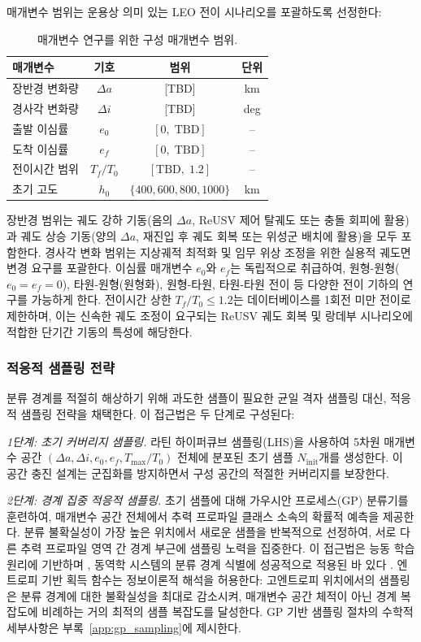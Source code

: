 매개변수 범위는 운용상 의미 있는 LEO 전이 시나리오를 포괄하도록 선정한다:

\begin{table}[ht]
\centering
\caption{매개변수 연구를 위한 구성 매개변수 범위.}
\label{tab:param_ranges}
\begin{tabular}{lccc}
\hline
매개변수 & 기호 & 범위 & 단위 \\
\hline
장반경 변화량 & $\Delta a$ & [TBD] & km \\
경사각 변화량 & $\Delta i$ & [TBD] & deg \\
출발 이심률 & $e_0$ & $[0,\;\text{TBD}]$ & -- \\
도착 이심률 & $e_f$ & $[0,\;\text{TBD}]$ & -- \\
전이시간 범위 & $T_f/T_0$ & $[\text{TBD},\; 1.2]$ & -- \\
초기 고도 & $h_0$ & $\{400, 600, 800, 1000\}$ & km \\
\hline
\end{tabular}
\end{table}

장반경 범위는 궤도 강하 기동(음의 $\Delta a$, ReUSV 제어 탈궤도 또는 충돌 회피에 활용)과 궤도 상승 기동(양의 $\Delta a$, 재진입 후 궤도 회복 또는 위성군 배치에 활용)을 모두 포함한다. 경사각 변화 범위는 지상궤적 최적화 및 임무 위상 조정을 위한 실용적 궤도면 변경 요구를 포괄한다. 이심률 매개변수 $e_0$와 $e_f$는 독립적으로 취급하여, 원형-원형($e_0 = e_f = 0$), 타원-원형(원형화), 원형-타원, 타원-타원 전이 등 다양한 전이 기하의 연구를 가능하게 한다. 전이시간 상한 $T_f/T_0 \leq 1.2$는 데이터베이스를 1회전 미만 전이로 제한하며, 이는 신속한 궤도 조정이 요구되는 ReUSV 궤도 회복 및 랑데부 시나리오에 적합한 단기간 기동의 특성에 해당한다.

\subsubsection{적응적 샘플링 전략}

분류 경계를 적절히 해상하기 위해 과도한 샘플이 필요한 균일 격자 샘플링 대신, 적응적 샘플링 전략을 채택한다. 이 접근법은 두 단계로 구성된다:

\textit{1단계: 초기 커버리지 샘플링.} 라틴 하이퍼큐브 샘플링(LHS)을 사용하여 5차원 매개변수 공간 $(\Delta a, \Delta i, e_0, e_f, T_{\max}/T_0)$ 전체에 분포된 초기 샘플 $N_{\text{init}}$개를 생성한다. 이 공간 충진 설계는 군집화를 방지하면서 구성 공간의 적절한 커버리지를 보장한다.

\textit{2단계: 경계 집중 적응적 샘플링.} 초기 샘플에 대해 가우시안 프로세스(GP) 분류기를 훈련하여, 매개변수 공간 전체에서 추력 프로파일 클래스 소속의 확률적 예측을 제공한다. 분류 불확실성이 가장 높은 위치에서 새로운 샘플을 반복적으로 선정하여, 서로 다른 추력 프로파일 영역 간 경계 부근에 샘플링 노력을 집중한다. 이 접근법은 능동 학습 원리에 기반하며 \citep{Settles2009}, 동역학 시스템의 분류 경계 식별에 성공적으로 적용된 바 있다 \citep{Lee2023}. 엔트로피 기반 획득 함수는 정보이론적 해석을 허용한다: 고엔트로피 위치에서의 샘플링은 분류 경계에 대한 불확실성을 최대로 감소시켜, 매개변수 공간 체적이 아닌 경계 복잡도에 비례하는 거의 최적의 샘플 복잡도를 달성한다. GP 기반 샘플링 절차의 수학적 세부사항은 부록~\ref{app:gp_sampling}에 제시한다.

